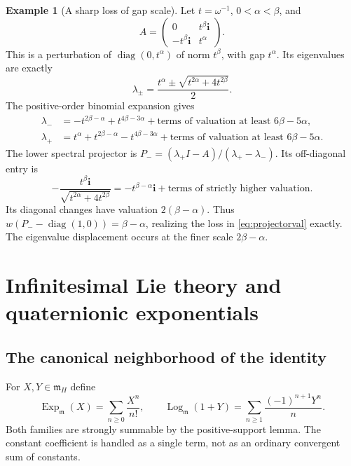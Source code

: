 \documentclass[11pt,letterpaper]{article}
\numberwithin{equation}{section}
\theoremstyle{definition}
\newtheorem{example}[example]{Example}
\theoremstyle{remark}
\newcommand{\mm}{\mathfrak m}
\newcommand{\ii}{\mathbf i}
\newcommand{\diag}{\operatorname{diag}}
\newcommand{\Exp}{\operatorname{Exp}}
\newcommand{\Log}{\operatorname{Log}}
\begin{document}
\begin{example}[A sharp loss of gap scale]\label{ex:spectral}
Let $t=\omega^{-1}$, $0<\alpha<\beta$, and
\[
 A=\begin{pmatrix}0&t^\beta\ii\\-t^\beta\ii&t^\alpha\end{pmatrix}.
\]
This is a perturbation of $\diag(0,t^\alpha)$ of norm $t^\beta$, with gap $t^\alpha$.
Its eigenvalues are exactly
\begin{equation}\label{eq:twoeigen}
 \lambda_\pm=\frac{t^\alpha\pm\sqrt{t^{2\alpha}+4t^{2\beta}}}{2}.
\end{equation}
The positive-order binomial expansion gives
\begin{align*}
 \lambda_-&=-t^{2\beta-\alpha}+t^{4\beta-3\alpha}
             +\text{terms of valuation at least }6\beta-5\alpha,\\
 \lambda_+&=t^\alpha+t^{2\beta-\alpha}-t^{4\beta-3\alpha}
             +\text{terms of valuation at least }6\beta-5\alpha.
\end{align*}
The lower spectral projector is
$P_-=(\lambda_+I-A)/(\lambda_+-\lambda_-)$.
Its off-diagonal entry is
\[
 -\frac{t^\beta\ii}{\sqrt{t^{2\alpha}+4t^{2\beta}}}
 =-t^{\beta-\alpha}\ii+\text{terms of strictly higher valuation}.
\]
Its diagonal changes have valuation $2(\beta-\alpha)$. Thus
$w(P_--\diag(1,0))=\beta-\alpha$, realizing the loss in \eqref{eq:projectorval} exactly.
The eigenvalue displacement occurs at the finer scale $2\beta-\alpha$.
\end{example}

\section{Infinitesimal Lie theory and quaternionic exponentials}\label{sec:explog}

\subsection{The canonical neighborhood of the identity}
For $X,Y\in\mm_H$ define
\begin{equation}\label{eq:explog}
 \Exp_{\mm}(X)=\sum_{n\ge0}\frac{X^n}{n!},\qquad
 \Log_{\mm}(1+Y)=\sum_{n\ge1}\frac{(-1)^{n+1}Y^n}{n}.
\end{equation}
Both families are strongly summable by the positive-support lemma. The constant coefficient
is handled as a single term, not as an ordinary convergent sum of constants.
\end{document}
